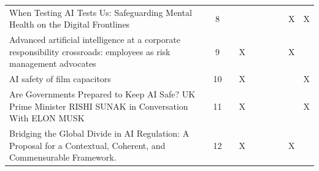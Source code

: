 \begin{landscape}
\begin{longtable}{|p{14cm}|c|c|c|c|c|c|c|c|c|}
		When Testing AI Tests Us: Safeguarding Mental Health on the Digital Frontlines                                                                          & 8           &                                    &                                                           &                                                       &                                                            &                                           &                                              & X                                                  & X                                  \\
		Advanced artificial intelligence at a corporate responsibility crossroads: employees as risk management advocates                                       & 9           &                                    & X                                                         &                                                       &                                                            &                                           &                                              & X                                                  &                                    \\
		AI safety of film capacitors                                                                                                                            & 10          &                                    & X                                                         &                                                       &                                                            &                                           &                                              &                                                    & X                                  \\
		Are Governments Prepared to Keep AI Safe? UK Prime Minister RISHI SUNAK in Conversation With ELON MUSK                                                  & 11          &                                    & X                                                         &                                                       &                                                            &                                           &                                              &                                                    & X                                  \\
		Bridging the Global Divide in AI Regulation: A Proposal for a Contextual, Coherent, and Commensurable Framework.                                        & 12          &                                    & X                                                         &                                                       &                                                            &                                           &                                              & X                                                  &                                    \\

\end{longtable}
\end{landscape}
